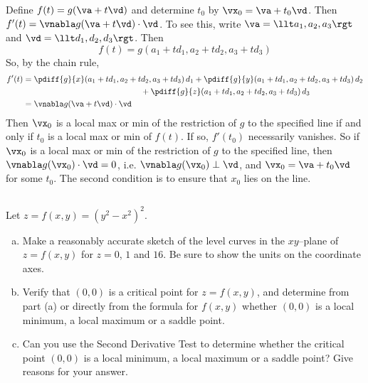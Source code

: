 \begin{solution}
 Define $f(t)=g(\va+t\vd)$ and determine $t_0$ by 
$\vx_0=\va+t_0\vd$. Then $f'(t)=\vnabla g(\va+t\vd)\cdot\vd$. 
To see this, write $\va=\llt a_1,a_2,a_3\rgt$ and $\vd=\llt d_1,d_2,d_3\rgt$.
Then 
\begin{equation*}
f(t)=g(a_1+td_1,a_2+td_2,a_3+td_3)
\end{equation*} 
So, by the chain rule,
\begin{align*}
f'(t) &= \pdiff{g}{x}(a_1+td_1,a_2+td_2,a_3+td_3)\,d_1
       +\pdiff{g}{y}(a_1+td_1,a_2+td_2,a_3+td_3)\,d_2 \\&\hskip2in
       +\pdiff{g}{z}(a_1+td_1,a_2+td_2,a_3+td_3)\,d_3 \\
     &=\vnabla g(\va+t\vd)\cdot\vd
\end{align*}
Then $\vx_0$ is a local
max or min of the restriction of $g$  to the specified line if and only
if $t_0$ is a local max or min of $f(t)$. If so, $f'(t_0)$  necessarily
vanishes. So if $\vx_0$ is a local
max or min of the restriction of $g$  to the specified line,
then $\vnabla g(\vx_0)\cdot\vd=0$, i.e. $\vnabla g(\vx_0)\perp\vd$, and $\vx_0=\va+t_0\vd$ for some $t_0$. 
The second condition is to ensure that $x_0$ lies on the line.
\end{solution}




\subsection*{\Procedural}

\begin{question}[M200 2005D] %
Let $z = f(x,y) = {(y^2 - x^2)}^2$.
\begin{enumerate}[(a)]
\item
Make a reasonably accurate sketch of the level curves in the $xy$--plane 
of $z = f(x,y)$ for $z = 0$, $1$ and $16$. Be sure to show the units 
on the coordinate axes.
\item
Verify that $(0,0)$ is a critical point for $z = f(x,y)$, and 
determine from part (a) or directly from the formula for $f(x,y)$ 
whether $(0, 0)$ is a local minimum, a local maximum or a saddle point.
\item
Can you use the Second Derivative Test to determine whether the 
critical point $(0, 0)$ is a local minimum, a local maximum or 
a saddle point? Give reasons for your answer.
\end{enumerate}

\end{question}

